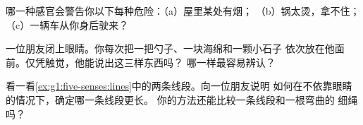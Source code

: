 \begin{exercise}[$\star$]\label{exo:g1:five-senses:7}
哪一种感官会警告你以下每种危险：（a）屋里某处有烟；
（b）锅太烫，拿不住；（c）一辆车从你身后驶来？
\end{exercise}

\begin{exercise}[$\star$]\label{exo:g1:five-senses:8}
一位朋友闭上眼睛。你每次把一把勺子、一块海绵和一颗小石子
依次放在他面前。仅凭触觉，他能说出这三样东西吗？
哪一样最容易辨认？
\end{exercise}

\begin{exercise}[$\star\star$]\label{exo:g1:five-senses:9}
看一看\cref{ex:g1:five-senses:lines}中的两条线段。向一位朋友说明
如何在不依靠眼睛的情况下，确定哪一条线段更长。
你的方法还能比较一条线段和一根弯曲的
细绳吗？
\end{exercise}

